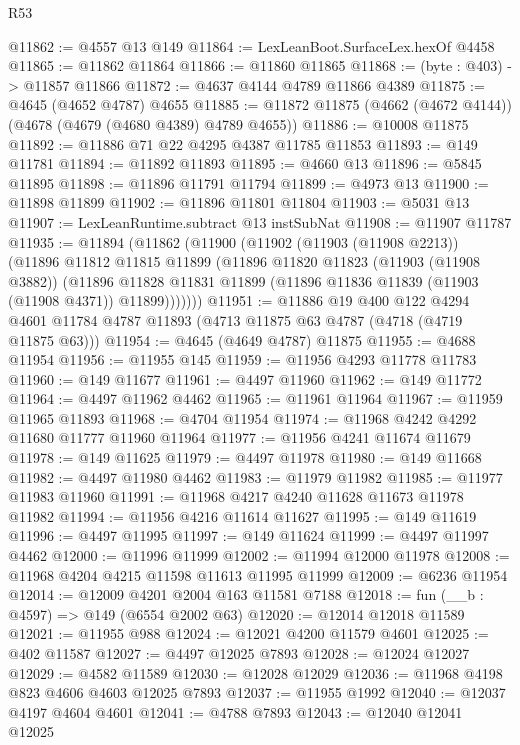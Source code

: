 \begin{lexlean}{R53}
\begin{coremodule}
@11862 := @4557 @13 @149
@11864 := LexLeanBoot.SurfaceLex.hexOf @4458
@11865 := @11862 @11864
@11866 := @11860 @11865
@11868 := (byte : @403) -> @11857 @11866
@11872 := @4637 @4144 @4789 @11866 @4389
@11875 := @4645 (@4652 @4787) @4655
@11885 := @11872 @11875 (@4662 (@4672 @4144)) (@4678 (@4679 (@4680 @4389) @4789 @4655))
@11886 := @10008 @11875
@11892 := @11886 @71 @22 @4295 @4387 @11785 @11853
@11893 := @149 @11781
@11894 := @11892 @11893
@11895 := @4660 @13
@11896 := @5845 @11895
@11898 := @11896 @11791 @11794
@11899 := @4973 @13
@11900 := @11898 @11899
@11902 := @11896 @11801 @11804
@11903 := @5031 @13
@11907 := LexLeanRuntime.subtract @13 instSubNat
@11908 := @11907 @11787
@11935 := @11894
    (@11862
      (@11900
        (@11902
          (@11903 (@11908 @2213))
          (@11896
            @11812
            @11815
            @11899
            (@11896
              @11820
              @11823
              (@11903 (@11908 @3882))
              (@11896
                @11828
                @11831
                @11899
                (@11896 @11836 @11839 (@11903 (@11908 @4371)) @11899)))))))
@11951 := @11886
    @19
    @400
    @122
    @4294
    @4601
    @11784
    @4787
    @11893
    (@4713 @11875 @63 @4787 (@4718 (@4719 @11875 @63)))
@11954 := @4645 (@4649 @4787) @11875
@11955 := @4688 @11954
@11956 := @11955 @145
@11959 := @11956 @4293 @11778 @11783
@11960 := @149 @11677
@11961 := @4497 @11960
@11962 := @149 @11772
@11964 := @4497 @11962 @4462
@11965 := @11961 @11964
@11967 := @11959 @11965 @11893
@11968 := @4704 @11954
@11974 := @11968 @4242 @4292 @11680 @11777 @11960 @11964
@11977 := @11956 @4241 @11674 @11679
@11978 := @149 @11625
@11979 := @4497 @11978
@11980 := @149 @11668
@11982 := @4497 @11980 @4462
@11983 := @11979 @11982
@11985 := @11977 @11983 @11960
@11991 := @11968 @4217 @4240 @11628 @11673 @11978 @11982
@11994 := @11956 @4216 @11614 @11627
@11995 := @149 @11619
@11996 := @4497 @11995
@11997 := @149 @11624
@11999 := @4497 @11997 @4462
@12000 := @11996 @11999
@12002 := @11994 @12000 @11978
@12008 := @11968 @4204 @4215 @11598 @11613 @11995 @11999
@12009 := @6236 @11954
@12014 := @12009 @4201 @2004 @163 @11581 @7188
@12018 := fun (__b : @4597) => @149 (@6554 @2002 @63)
@12020 := @12014 @12018 @11589
@12021 := @11955 @988
@12024 := @12021 @4200 @11579 @4601
@12025 := @402 @11587
@12027 := @4497 @12025 @7893
@12028 := @12024 @12027
@12029 := @4582 @11589
@12030 := @12028 @12029
@12036 := @11968 @4198 @823 @4606 @4603 @12025 @7893
@12037 := @11955 @1992
@12040 := @12037 @4197 @4604 @4601
@12041 := @4788 @7893
@12043 := @12040 @12041 @12025

\end{coremodule}
\end{lexlean}
